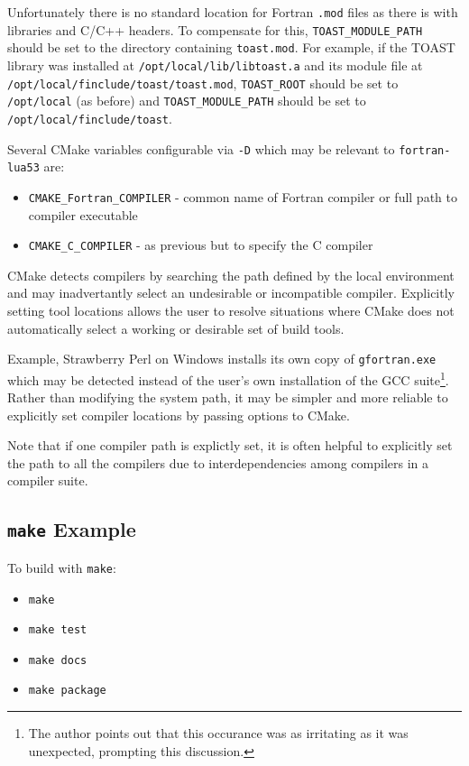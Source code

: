 Unfortunately there is no standard location for Fortran \texttt{.mod}
files as there is with libraries and C/C++ headers. To compensate for this,
\texttt{TOAST\_MODULE\_PATH} should be set to the directory containing
\texttt{toast.mod}. For example, if the TOAST library was installed at
\texttt{/opt/local/lib/libtoast.a} and its module file at
\texttt{/opt/local/finclude/toast/toast.mod}, \texttt{TOAST\_ROOT}
should be set to \texttt{/opt/local} (as before) and
\texttt{TOAST\_MODULE\_PATH} should be set to
\texttt{/opt/local/finclude/toast}.

Several CMake variables configurable via \texttt{-D} which may be relevant
to \texttt{fortran-lua53} are:

\begin{itemize}
    \item \texttt{CMAKE\_Fortran\_COMPILER} - common name of Fortran compiler or full path to compiler executable
    \item \texttt{CMAKE\_C\_COMPILER} - as previous but to specify the C compiler
\end{itemize}

CMake detects compilers by searching the path defined by the local
environment and may inadvertantly select an undesirable or incompatible
compiler. Explicitly setting tool locations allows the user to resolve
situations where CMake does not automatically select a working or
desirable set of build tools.

Example, Strawberry Perl on Windows installs its own copy of
\texttt{gfortran.exe} which may be detected instead of the user's own
installation of the GCC suite\footnote{The author points out that this occurance
was as irritating as it was unexpected, prompting this discussion.}.
Rather than modifying the system path, it may be simpler and more reliable
to explicitly set compiler locations by passing options to CMake.

Note that if one compiler path is explictly set, it is often helpful
to explicitly set the path to all the compilers due to interdependencies
among compilers in a compiler suite.

\subsection{\texttt{make} Example}

To build with \texttt{make}:

\begin{itemize}
    \item \texttt{make}
    \item \texttt{make test}
    \item \texttt{make docs}
    \item \texttt{make package}
\end{itemize}

